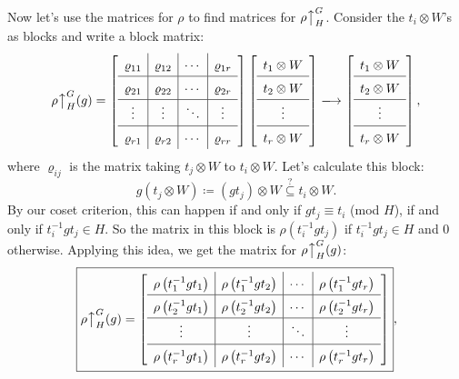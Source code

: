 \documentclass[12pt]{article}
\newcommand\inv[1]{#1^{-1}}
\theoremstyle{definition}
\begin{document}
Now let's use the matrices for $\rho$ to find matrices for $\rho \big\uparrow_H^G$. Consider the $t_i \otimes W$'s as blocks and write a block matrix: 
\begin{equation}
    \rho \big\uparrow_H^G(g) = 
    \left[\def\arraystretch{1.5}
    \begin{array}{c | c | c | c}
        \varrho_{11} & \varrho_{12} & \cdots & \varrho_{1r} \\
        \hline
        \varrho_{21} & \varrho_{22} & \cdots & \varrho_{2r} \\
        \hline 
        \vdots & \vdots & \ddots & \vdots \\
        \hline
        \varrho_{r1} & \varrho_{r2} & \cdots & \varrho_{rr}
    \end{array}
    \right]
    \left[\def\arraystretch{1.5}
    \begin{array}{c}
        t_1 \otimes W \\
        \hline
        t_2 \otimes W \\
        \hline 
        \vdots \\
        \hline
        t_r \otimes W
    \end{array}
    \right]
    \xlongrightarrow{}
    \left[\def\arraystretch{1.5}
    \begin{array}{c}
        t_1 \otimes W \\
        \hline
        t_2 \otimes W \\
        \hline 
        \vdots \\
        \hline
        t_r \otimes W
    \end{array}
    \right],
\end{equation}
where $\varrho_{ij}$ is the matrix taking $t_j \otimes W$ to $t_i \otimes W$. Let's calculate this block: 
\begin{equation}
    g ( t_j \otimes W ) \coloneqq  (g t_j) \otimes W \stackrel{?}{\subseteq} t_i \otimes W.
\end{equation}
By our coset criterion, this can happen if and only if $g t_j \equiv t_i$ (mod $H$), if and only if $\inv{t_i} g t_j \in H$. So the matrix in this block is $\rho \left( \inv{t_i} g t_j \right)$ if $\inv{t_i} g t_j \in H$ and $0$ otherwise. Applying this idea, we get the matrix for $\rho \big\uparrow_H^G(g)$:
\begin{equation}
    \boxed{
        \rho \big\uparrow_H^G(g) = 
        \left[\def\arraystretch{1.5}
        \begin{array}{c | c | c | c}
            \rho \left( \inv{t_1} g t_1 \right) & \rho \left( \inv{t_1} g t_2 \right) & \cdots & \rho \left( \inv{t_1} g t_r \right) \\
            \hline
            \rho \left( \inv{t_2} g t_1 \right) & \rho \left( \inv{t_2} g t_2 \right) & \cdots & \rho \left( \inv{t_2} g t_r \right) \\
            \hline 
            \vdots & \vdots & \ddots & \vdots \\
            \hline
            \rho \left( \inv{t_r} g t_1 \right) & \rho \left( \inv{t_r} g t_2 \right) & \cdots & \rho \left( \inv{t_r} g t_r \right)
        \end{array}
        \right]
    },
\end{equation}
\end{document}

